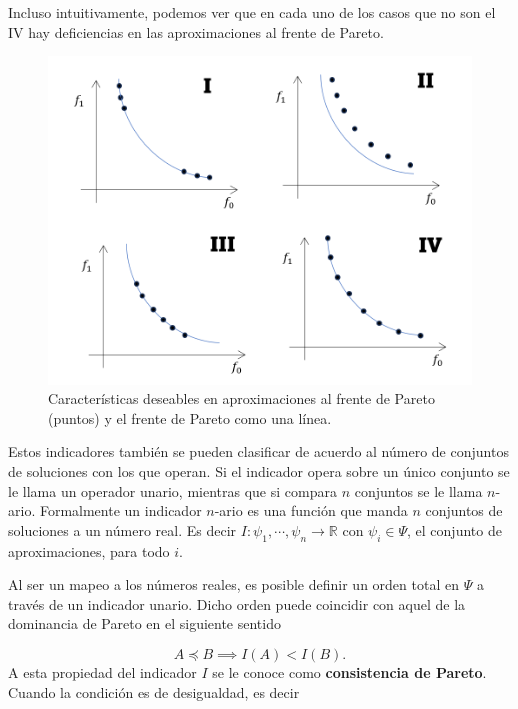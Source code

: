 Incluso intuitivamente, podemos ver que en cada uno de los casos que no son el IV hay deficiencias en las aproximaciones al frente de Pareto. 

\begin{figure}[H]
    \centering
    \includegraphics[scale=0.5]{Figuras/carac_deseables_Pareto.png}
    \caption[Características deseables en aproximación al PF]{Características deseables en aproximaciones al frente de Pareto (puntos) y el frente de Pareto como una línea.}
    \label{fig:carac_deseables_aprox}
\end{figure}

Estos indicadores también se pueden clasificar de acuerdo al número de conjuntos de soluciones con los que operan. Si el indicador opera sobre un único conjunto  se le llama un operador unario, mientras que si compara $n$ conjuntos se le llama $n$-ario. Formalmente un indicador $n$-ario \cite{PFI} es  una función que manda  $n$ conjuntos de soluciones a un número real. Es decir $I:\psi_1,\cdots,\psi_n \rightarrow \mathbb{R}$ con $\psi_i \in  \Psi$, el conjunto de aproximaciones, para todo $i$. 


Al ser un mapeo a los números reales, es posible definir un orden total en $\Psi$ a través de un indicador unario. Dicho orden puede coincidir con aquel de la dominancia de Pareto en el siguiente sentido

\begin{equation} \label{eq:consistente_Pareto}
    A \preceq B \implies I(A) < I(B).
\end{equation}
A esta propiedad del indicador $I$ se le conoce como \textbf{consistencia de Pareto}. Cuando la condición es de desigualdad, es decir 

